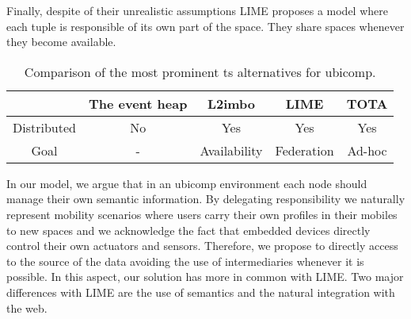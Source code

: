 Finally, despite of their unrealistic assumptions LIME proposes a model where each tuple is responsible of its own part of the space.
They share spaces whenever they become available.


\begin{table}%
  \centering
  \begin{tabular}{c|cccc}%
      ~ & The event heap & L2imbo & LIME & TOTA \\
      \hline
      \hline
      Distributed & No & Yes & Yes & Yes \\
      Goal & - & Availability & Federation & Ad-hoc \\
  \end{tabular}
  \caption{Comparison of the most prominent \acl{ts} alternatives for \acl{ubicomp}.} %
  \label{tab:ubicomp_ts_comparison}
\end{table}


\medskip

In our model, we argue that in an \ac{ubicomp} environment each node should manage their own semantic information.
By delegating responsibility 
we naturally represent mobility scenarios where users carry their own profiles in their mobiles to new spaces 
and 
we acknowledge the fact that embedded devices directly control their own actuators and sensors.
Therefore, we propose to directly access to the source of the data avoiding the use of intermediaries whenever it is possible.
In this aspect, our solution has more in common with LIME.
Two major differences with LIME are the use of semantics and the natural integration with the web. %